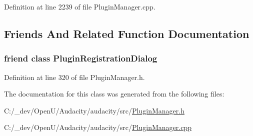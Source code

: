 Definition at line 2239 of file Plugin\+Manager.\+cpp.



\subsection{Friends And Related Function Documentation}
\subsubsection[{\texorpdfstring{Plugin\+Registration\+Dialog}{PluginRegistrationDialog}}]{\setlength{\rightskip}{0pt plus 5cm}friend class {\bf Plugin\+Registration\+Dialog}\hspace{0.3cm}{\ttfamily [friend]}}\hypertarget{class_plugin_manager_a618e36ac09e28a795a6f15bc12891e95}{}\label{class_plugin_manager_a618e36ac09e28a795a6f15bc12891e95}


Definition at line 320 of file Plugin\+Manager.\+h.



The documentation for this class was generated from the following files\+:\begin{DoxyCompactItemize}
\item 
C\+:/\+\_\+dev/\+Open\+U/\+Audacity/audacity/src/\hyperlink{_plugin_manager_8h}{Plugin\+Manager.\+h}\item 
C\+:/\+\_\+dev/\+Open\+U/\+Audacity/audacity/src/\hyperlink{_plugin_manager_8cpp}{Plugin\+Manager.\+cpp}\end{DoxyCompactItemize}
